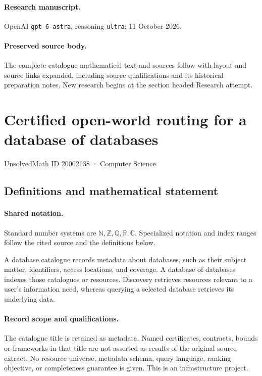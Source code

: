 \documentclass[11pt]{article}
\begin{document}
\paragraph{Research manuscript.} OpenAI \texttt{gpt-6-astra}, reasoning \texttt{ultra}; 11 October 2026.
\paragraph{Preserved source body.} The complete catalogue mathematical text and sources follow with layout and source links expanded, including source qualifications and its historical preparation notes. New research begins at the section headed Research attempt.

\section{Certified open-world routing for a database of databases}\label{20002138}
{\small UnsolvedMath ID 20002138 · Computer Science}
\subsection{Definitions and mathematical statement}

\paragraph{Shared notation.}Standard number systems are $\mathbb N,\mathbb Z,\mathbb Q,\mathbb R,\mathbb C$. Specialized notation and index ranges follow the cited source and the definitions below.


A database catalogue records metadata about databases, such as their subject matter, identifiers, access locations, and coverage. A database of databases indexes those catalogues or resources. Discovery retrieves resources relevant to a user's information need, whereas querying a selected database retrieves its underlying data.
\paragraph{Record scope and qualifications.}
The catalogue title is retained as metadata. Named certificates, contracts, bounds or frameworks in that title are not asserted as results of the original source extract.
No resource universe, metadata schema, query language, ranking objective, or completeness guarantee is given. This is an infrastructure project.
\end{document}

